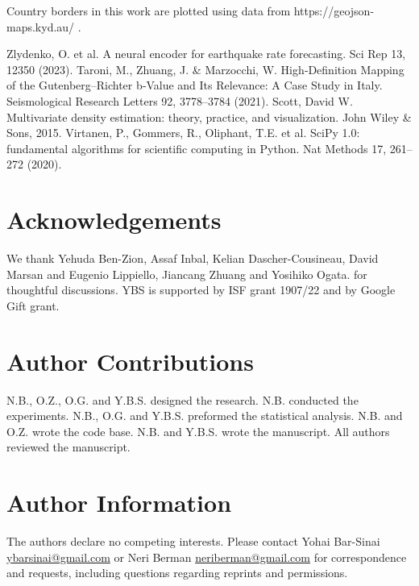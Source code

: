 \documentclass[pdflatex]{sn-jnl}
\begin{document}
Country borders in this work are plotted using data from https://geojson-maps.kyd.au/ .

\newpage
\renewcommand\refname{Methods References}
\begin{thebibliography}{10}
Zlydenko, O. et al. A neural encoder for earthquake rate forecasting. Sci Rep 13, 12350 (2023).
Taroni, M., Zhuang, J. \& Marzocchi, W. High‐Definition Mapping of the Gutenberg–Richter b‐Value and Its Relevance: A Case Study in Italy. Seismological Research Letters 92, 3778–3784 (2021).
Scott, David W. Multivariate density estimation: theory, practice, and visualization. John Wiley \& Sons, 2015.  
Virtanen, P., Gommers, R., Oliphant, T.E. et al. SciPy 1.0: fundamental algorithms for scientific computing in Python. Nat Methods 17, 261–272 (2020).





\end{thebibliography}


\newpage
\section*{Acknowledgements}
We thank Yehuda Ben-Zion, Assaf Inbal, Kelian Dascher-Cousineau, David Marsan and Eugenio Lippiello, Jiancang Zhuang and Yosihiko Ogata. for thoughtful discussions. YBS is supported by ISF grant 1907/22 and by Google Gift grant.

\section*{Author Contributions}
N.B., O.Z., O.G. and Y.B.S. designed the research. N.B. conducted the experiments. N.B., O.G. and Y.B.S. preformed the statistical analysis. N.B. and O.Z. wrote the code base. N.B. and Y.B.S. wrote the manuscript. All authors reviewed the manuscript.

\section*{Author Information}
The authors declare no competing interests. Please contact Yohai Bar-Sinai \href{mailto:ybarsinai@gmail.com}{ybarsinai@gmail.com} or Neri Berman \href{mailto:neriberman@gmail.com}{neriberman@gmail.com} for correspondence and requests, including questions regarding reprints and permissions.
\end{document}
